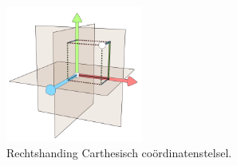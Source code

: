 \begin{figure}
    \centering\includegraphics[width=0.4\textwidth]{./img/raw/coord-stelsel.png}
  \caption{Rechtshanding Carthesisch co\"ordinatenstelsel.}
  \label{fig:coord-stelsel}
\end{figure}
